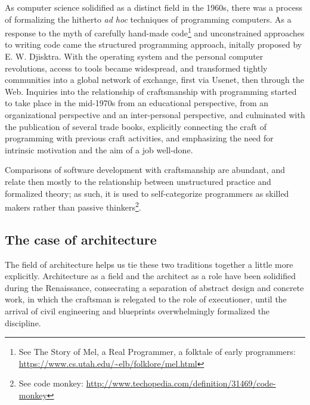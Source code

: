 \documentclass{article}
\begin{document}
As computer science solidified as a distinct field in the 1960s\cite{tedre_development_2006}, there was a process of formalizing the hitherto \textit{ad hoc} techniques of programming computers. As a response to the myth of carefully hand-made code\footnote{See The Story of Mel, a Real Programmer, a folktale of early programmers: \url{https://www.cs.utah.edu/~elb/folklore/mel.html}} and unconstrained approaches to writing code came the structured programming approach, initally proposed by E. W. Djisktra\cite{dijkstra_chapter_1972}. With the operating system and the personal computer revolutions, access to tools became widespread, and transformed tightly communities into a global network of exchange, first via Usenet, then through the Web. Inquiries into the relationship of craftsmanship with programming started to take place in the mid-1970s from an educational perspective\cite{dijkstra_craftsman_1982}, from an organizational perspective\cite{brooks_mythical_1975} and an inter-personal perspective\cite{weinberg_psychology_1998}, and culminated with the publication of several trade books\cite{martin_clean_2008,hendrickson_software_2002}, explicitly connecting the craft of programming with previous craft activities, and emphasizing the need for intrinsic motivation and the aim of a job well-done\cite{hoover_apprenticeship_2009,goodliffe_code_2007}.

Comparisons of software development with craftsmanship are abundant, and relate then mostly to the relationship between unstructured practice and formalized theory; as such, it is used to self-categorize programmers as skilled makers rather than passive thinkers\footnote{See code monkey: \url{http://www.techopedia.com/definition/31469/code-monkey}}.

\subsection{The case of architecture}

The field of architecture helps us tie these two traditions together a little more explicitly. Architecture as a field and the architect as a role have been solidified during the Renaissance\cite{pevsner_term_1942}, consecrating a separation of abstract design and concrete work, in which the craftsman is relegated to the role of executioner, until the arrival of civil engineering and blueprints overwhelmingly formalized the discipline.
\end{document}
